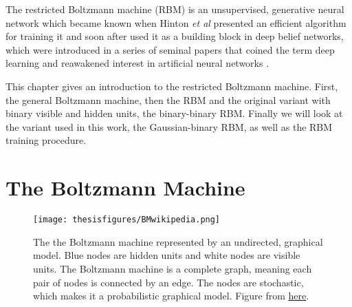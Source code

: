 \documentclass[twoside,english]{uiofysmaster}
\begin{document}
The restricted Boltzmann machine (RBM) is an unsupervised, generative neural network which became known when Hinton \textit{et al} presented an efficient algorithm for training it \cite{Hinton2002} and soon after used it as a building block in deep belief networks, which were introduced in a series of seminal papers that coined the term deep learning and reawakened interest in artificial neural networks \cite{Hinton2006a} \cite{Hinton2006} \cite{Hinton2007}.

This chapter gives an introduction to the restricted Boltzmann machine. First, the general Boltzmann machine, then the RBM and the original variant with binary visible and hidden units, the binary-binary RBM. Finally we will look at the variant used in this work, the Gaussian-binary RBM, as well as the RBM training procedure.










\section{The Boltzmann Machine}
\label{sec:BM}


\begin{figure}
\centering
 \texttt{[image: thesisfigures/BMwikipedia.png]}
 \caption{The the Boltzmann machine represented by an undirected, graphical model. Blue nodes are hidden units and white nodes are visible units. The Boltzmann machine is a complete graph, meaning each pair of nodes is connected by an edge. The nodes are stochastic, which makes it a probabilistic graphical model. Figure from \href{https://en.wikipedia.org/wiki/Boltzmann_machine}{here}.}
 \label{fig:BMwikipedia}
\end{figure}
\end{document}

